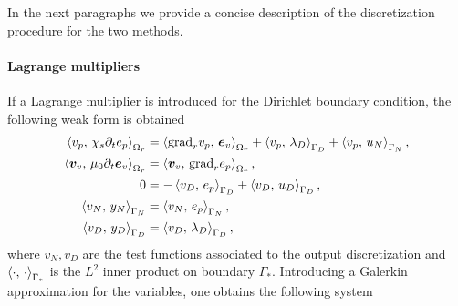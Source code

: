 In the next paragraphs we provide a concise description of the discretization procedure for the two methods.

\paragraph{Lagrange multipliers}
If a Lagrange multiplier is introduced for the Dirichlet boundary condition, the following weak form is obtained
\begin{equation}
\begin{aligned}
\inner[\Omega_r]{v_p}{\chi_s \partial_t e_p} &= \inner[\Omega_r]{{\grad}_r v_p}{\bm{e}_v} + \inner[\Gamma_D]{v_p}{\lambda_D}  +\inner[\Gamma_N]{v_p}{u_N}, \\
\inner[\Omega_r]{\bm{v}_v}{\mu_0 \partial_t \bm{e}_v} &=  \inner[\Omega_r]{\bm{v}_v}{{\grad}_r e_p}, \\
0 &= - \inner[\Gamma_D]{v_D}{e_p} + \inner[\Gamma_D]{v_D}{u_D}, \\
\inner[\Gamma_N]{v_N}{y_N} &= \inner[\Gamma_N]{v_N}{e_p}, \\
\inner[\Gamma_D]{v_D}{y_D} &= \inner[\Gamma_D]{v_D}{\lambda_D},
\end{aligned}
\end{equation}
where $v_N, v_D$ are the test functions associated to the output discretization and $\inner[\Gamma_{*}]{\cdot}{\cdot}$ is the $L^2$ inner product on boundary $\Gamma_*$. Introducing a Galerkin approximation for the variables, one obtains the following system
